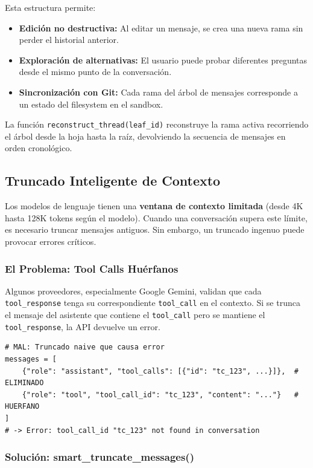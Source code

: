 Esta estructura permite:
\begin{itemize}
    \item \textbf{Edición no destructiva:} Al editar un mensaje, se crea una nueva rama sin perder el historial anterior.
    \item \textbf{Exploración de alternativas:} El usuario puede probar diferentes preguntas desde el mismo punto de la conversación.
    \item \textbf{Sincronización con Git:} Cada rama del árbol de mensajes corresponde a un estado del filesystem en el sandbox.
\end{itemize}

La función \texttt{reconstruct\_thread(leaf\_id)} reconstruye la rama activa recorriendo el árbol desde la hoja hasta la raíz, devolviendo la secuencia de mensajes en orden cronológico.

\subsection{Truncado Inteligente de Contexto}

Los modelos de lenguaje tienen una \textbf{ventana de contexto limitada} (desde 4K hasta 128K tokens según el modelo). Cuando una conversación supera este límite, es necesario truncar mensajes antiguos. Sin embargo, un truncado ingenuo puede provocar errores críticos.

\subsubsection{El Problema: Tool Calls Huérfanos}

Algunos proveedores, especialmente Google Gemini, validan que cada \texttt{tool\_response} tenga su correspondiente \texttt{tool\_call} en el contexto. Si se trunca el mensaje del asistente que contiene el \texttt{tool\_call} pero se mantiene el \texttt{tool\_response}, la API devuelve un error.

\begin{verbatim}
# MAL: Truncado naive que causa error
messages = [
    {"role": "assistant", "tool_calls": [{"id": "tc_123", ...}]},  # ELIMINADO
    {"role": "tool", "tool_call_id": "tc_123", "content": "..."}   # HUERFANO
]
# -> Error: tool_call_id "tc_123" not found in conversation
\end{verbatim}

\subsubsection{Solución: smart\_truncate\_messages()}

